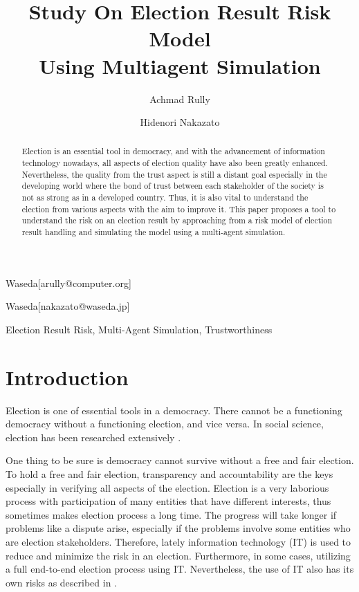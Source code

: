 \documentclass[JIP]{ipsj}
\begin{document}
\title{Study On Election Result Risk Model\\ Using Multiagent Simulation}


\author{Achmad Rully}{Waseda}[arully@computer.org]
\author{Hidenori Nakazato}{Waseda}[nakazato@waseda.jp]


\begin{abstract}
Election is an essential tool in democracy, and with the advancement of information technology nowadays, all aspects of election quality have also been greatly enhanced. Nevertheless, the quality from the trust aspect is still a distant goal especially in the developing world where the bond of trust between each stakeholder of the society is not as strong as in a developed country. Thus, it is also vital to understand the election from various aspects with the aim to improve it. This paper proposes a tool to understand the risk on an election result by approaching from a risk model of election result handling and simulating the model using a multi-agent simulation.
\end{abstract}

\begin{keyword}
Election Result Risk, Multi-Agent Simulation, Trustworthiness
\end{keyword}

\maketitle

\section{Introduction}

Election is one of essential tools in a democracy. There cannot be a functioning democracy without a functioning election, and vice versa. In social science, election has been researched extensively \cite{Manan2010}.

One thing to be sure is democracy cannot survive without a free and fair election. To hold a free and fair election, transparency and accountability are the keys especially in verifying all aspects of the election. Election is a very laborious process with participation of many entities that have different interests, thus sometimes makes election process a long time. The progress will take longer if problems like a dispute arise, especially if the problems involve some entities who are election stakeholders. Therefore, lately information technology (IT) is used to reduce and minimize the risk in an election. Furthermore, in some cases, utilizing a full end-to-end election process using IT. Nevertheless, the use of IT also has its own risks as described in \cite{Neumann1995}.
\end{document}
